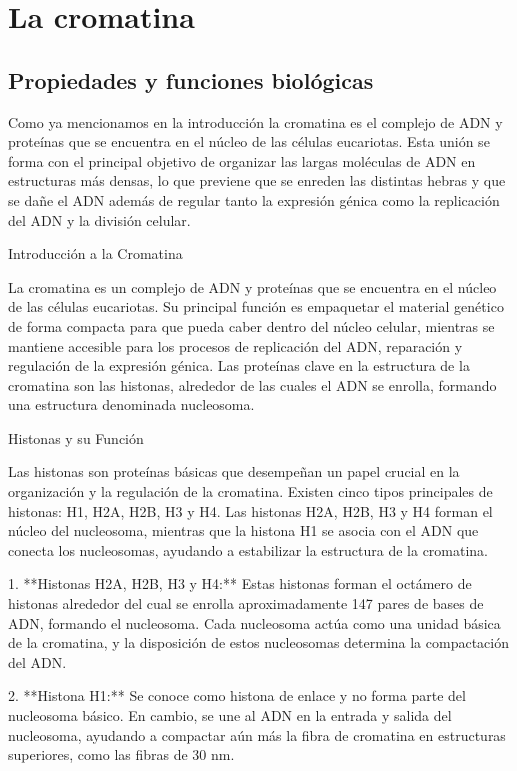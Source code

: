 \chapter{La cromatina}
\label{cap:chromatin}

\section{Propiedades y funciones biológicas}

Como ya mencionamos en la introducción la cromatina es el complejo de ADN y proteínas que se encuentra en el núcleo de las células eucariotas. Esta unión se forma con el principal objetivo de organizar las largas moléculas de ADN en estructuras más densas, lo que previene que se enreden las distintas hebras y que se dañe el ADN además de regular tanto la expresión génica como la replicación del ADN y la división celular.

Introducción a la Cromatina

La cromatina es un complejo de ADN y proteínas que se encuentra en el núcleo de las células eucariotas. Su principal función es empaquetar el material genético de forma compacta para que pueda caber dentro del núcleo celular, mientras se mantiene accesible para los procesos de replicación del ADN, reparación y regulación de la expresión génica. Las proteínas clave en la estructura de la cromatina son las histonas, alrededor de las cuales el ADN se enrolla, formando una estructura denominada nucleosoma.

Histonas y su Función

Las histonas son proteínas básicas que desempeñan un papel crucial en la organización y la regulación de la cromatina. Existen cinco tipos principales de histonas: H1, H2A, H2B, H3 y H4. Las histonas H2A, H2B, H3 y H4 forman el núcleo del nucleosoma, mientras que la histona H1 se asocia con el ADN que conecta los nucleosomas, ayudando a estabilizar la estructura de la cromatina.

1. **Histonas H2A, H2B, H3 y H4:** Estas histonas forman el octámero de histonas alrededor del cual se enrolla aproximadamente 147 pares de bases de ADN, formando el nucleosoma. Cada nucleosoma actúa como una unidad básica de la cromatina, y la disposición de estos nucleosomas determina la compactación del ADN.

2. **Histona H1:** Se conoce como histona de enlace y no forma parte del nucleosoma básico. En cambio, se une al ADN en la entrada y salida del nucleosoma, ayudando a compactar aún más la fibra de cromatina en estructuras superiores, como las fibras de 30 nm.

